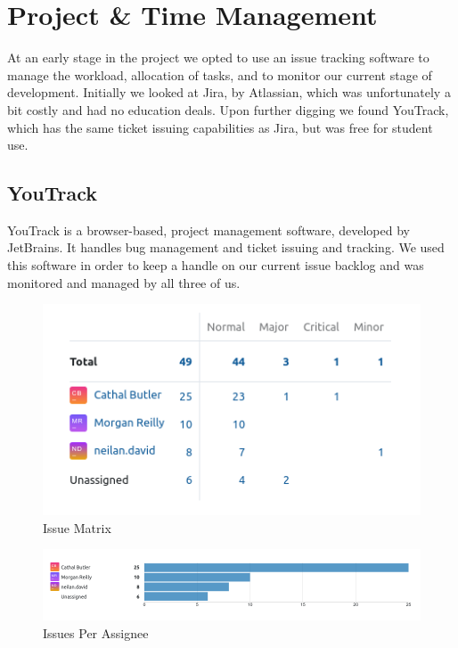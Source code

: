 \section{Project \& Time Management}
At an early stage in the project we opted to use an issue tracking software to manage the workload, allocation of tasks, and to monitor our current stage of development.
Initially we looked at Jira, by Atlassian, which was unfortunately a bit costly and had no education deals. Upon further digging we found YouTrack, which has the same ticket issuing capabilities as Jira, but was free for student use.
\subsection{YouTrack}
YouTrack is a browser-based, project management software, developed by JetBrains. It handles bug management and ticket issuing and tracking. We used this software in order to keep a handle on our current issue backlog and was monitored and managed by all three of us. 


\begin{figure}[h!]
    \caption{Issue Matrix}
    \label{image:issuesMatrix}
    \centering
    \includegraphics[width=1.0\textwidth]{images/IssuesMatrix.png}
\end{figure}


\begin{figure}[h!]
    \caption{Issues Per Assignee}
    \label{image:IPA}
    \centering
    \includegraphics[width=1.0\textwidth]{images/IssuesPerAssignee.png}
\end{figure}


